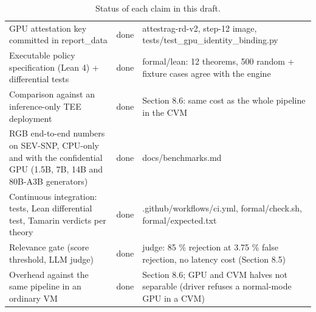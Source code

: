 \documentclass[letterpaper,twocolumn,10pt]{article}
\begin{document}
\begin{table}[t]
\begin{tabular}{p{2.6in}p{1.3in}p{2.45in}}
GPU attestation key committed in report\_data & done & attestrag-rd-v2, step-12 image, tests/test\_gpu\_identity\_binding.py \\
Executable policy specification (Lean 4) + differential tests & done & formal/lean: 12 theorems, 500 random + fixture cases agree with the engine \\
Comparison against an inference-only TEE deployment & done & Section 8.6: same cost as the whole pipeline in the CVM \\
RGB end-to-end numbers on SEV-SNP, CPU-only and with the confidential GPU (1.5B, 7B, 14B and 80B-A3B generators) & done & docs/benchmarks.md \\
Continuous integration: tests, Lean differential test, Tamarin verdicts per theory & done & .github/workflows/ci.yml, formal/check.sh, formal/expected.txt \\
Relevance gate (score threshold, LLM judge) & done & judge: 85 \% rejection at 3.75 \% false rejection, no latency cost (Section 8.5) \\
Overhead against the same pipeline in an ordinary VM & done & Section 8.6; GPU and CVM halves not separable (driver refuses a normal-mode GPU in a CVM) \\
\bottomrule\end{tabular}
\caption{Status of each claim in this draft.}\label{tab:status}
\end{table}



\end{document}
